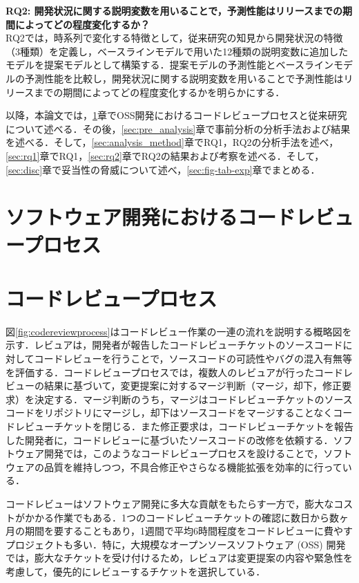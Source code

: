 \documentclass[submit]{ipsj}
\newcommand{\rqtwo}{開発状況に関する説明変数を用いることで，予測性能はリリースまでの期間によってどの程度変化するか？}
\begin{document}
\noindent\textbf{RQ2: \rqtwo}\\
RQ2では，時系列で変化する特徴として，従来研究\cite{integrator}\cite{release_merge}の知見から開発状況の特徴（3種類）を定義し，ベースラインモデルで用いた12種類の説明変数に追加したモデルを提案モデルとして構築する．提案モデルの予測性能とベースラインモデルの予測性能を比較し，開発状況に関する説明変数を用いることで予測性能はリリースまでの期間によってどの程度変化するかを明らかにする．

以降，本論文では，\ref{sec:intro}章でOSS開発におけるコードレビュープロセスと従来研究について述べる．その後，\ref{sec:pre_analysis}章で事前分析の分析手法および結果を述べる．そして，\ref{sec:analysis_method}章でRQ1，RQ2の分析手法を述べ，\ref{sec:rq1}章でRQ1，\ref{sec:rq2}章でRQ2の結果および考察を述べる．そして，\ref{sec:disc}章で妥当性の脅威について述べ，\ref{sec:fig-tab-exp}章でまとめる．

\section{ソフトウェア開発におけるコードレビュープロセス}\label{sec:intro}

\section{コードレビュープロセス}
図\ref{fig:codereviewprocess}はコードレビュー作業の一連の流れを説明する概略図を示す．レビュアは，開発者が報告したコードレビューチケットのソースコードに対してコードレビューを行うことで，ソースコードの可読性やバグの混入有無等を評価する．コードレビュープロセスでは，複数人のレビュアが行ったコードレビューの結果に基づいて，変更提案に対するマージ判断（マージ，却下，修正要求）を決定する．マージ判断のうち，マージはコードレビューチケットのソースコードをリポジトリにマージし，却下はソースコードをマージすることなくコードレビューチケットを閉じる．また修正要求は，コードレビューチケットを報告した開発者に，コードレビューに基づいたソースコードの改修を依頼する．ソフトウェア開発では，このようなコードレビュープロセスを設けることで，ソフトウェアの品質を維持しつつ，不具合修正やさらなる機能拡張を効率的に行っている．

コードレビューはソフトウェア開発に多大な貢献をもたらす一方で，膨大なコストがかかる作業でもある．1つのコードレビューチケットの確認に数日から数ヶ月の期間を要することもあり，1週間で平均6時間程度をコードレビューに費やすプロジェクトも多い\cite{review2}．特に，大規模なオープンソースソフトウェア (OSS) 開発では，膨大なチケットを受け付けるため，レビュアは変更提案の内容や緊急性を考慮して，優先的にレビューするチケットを選択している\cite{integrator}．
\end{document}
